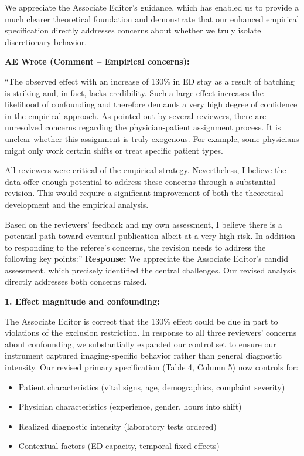 \documentclass[11pt]{article}
\newenvironment{quote2}
{ \bigskip
\noindent
         \small\em
         \baselineskip=14pt
}
\newcommand{\1}{\hbox{\rm 1\kern-.35em 1}}
\begin{document}
We appreciate the Associate Editor's guidance, which has enabled us to provide a much clearer theoretical foundation and demonstrate that our enhanced empirical specification directly addresses concerns about whether we truly isolate discretionary behavior.
\color{black}

\begin{quote2}
\textbf{AE Wrote (Comment – Empirical concerns):} 

\noindent``The observed effect with an increase of 130\% in ED stay as a result of batching is striking and, in fact, lacks credibility. Such a large effect increases the likelihood of confounding and therefore demands a very high degree of confidence in the empirical approach. As pointed out by several reviewers, there are unresolved concerns regarding the physician-patient assignment process. It is unclear whether this assignment is truly exogenous. For example, some physicians might only work certain shifts or treat specific patient types.

All reviewers were critical of the empirical strategy. Nevertheless, I believe the data offer enough potential to address these concerns through a substantial revision. This would require a significant improvement of both the theoretical development and the empirical analysis.

Based on the reviewers’ feedback and my own assessment, I believe there is a potential path toward eventual publication albeit at a very high risk. In addition to responding to the referee’s concerns, the revision needs to address the following key points:” 
\end{quote2}

\noindent\textbf{Response:} \color{blue}We appreciate the Associate Editor's candid assessment, which precisely identified the central challenges. Our revised analysis directly addresses both concerns raised.

\textbf{1. Effect magnitude and confounding:}

The Associate Editor is correct that the 130\% effect could be due in part to violations of the exclusion restriction. In response to all three reviewers' concerns about confounding, we substantially expanded our control set to ensure our instrument captured imaging-specific behavior rather than general diagnostic intensity. Our revised primary specification (Table 4, Column 5) now controls for:

\begin{itemize}
\item Patient characteristics (vital signs, age, demographics, complaint severity)
\item Physician characteristics (experience, gender, hours into shift)  
\item Realized diagnostic intensity (laboratory tests ordered)
\item Contextual factors (ED capacity, temporal fixed effects)
\end{itemize}
\end{document}
